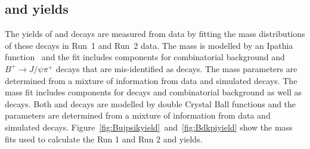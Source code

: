 {%


\subsection[\bdkpi and \bujpsik yields]{\boldmath{\bdkpi} and \boldmath{\bujpsik} yields}
\label{sec:yeilds}
The yields of \bujpsik and \bdkpi decays are measured from data by fitting the mass distributions of these decays in Run~1 and Run~2 data. %
The \bujpsik mass \pdf is modelled by an Ipathia function~\cite{Santos:2013gra} and the fit includes components for combinatorial background and $B^{+} \to J/\psi \pi^{+}$ decays that are mis-identified as \bujpsik decays. The mass \pdf parameters are determined from a mixture of information from data and simulated decays. The \bdkpi mass fit includes components for \bskpi decays and combinatorial background as well as \bdkpi decays. Both \bdkpi and \bskpi decays are modelled by double Crystal Ball functions and the parameters are determined from a mixture of information from data and simulated decays. %
Figure~\ref{fig:Bujpsikyield}~and~\ref{fig:Bdkpiyield} show the mass fits used to calculate the Run 1 and Run 2 \bujpsik and \bdkpi yields.





}
